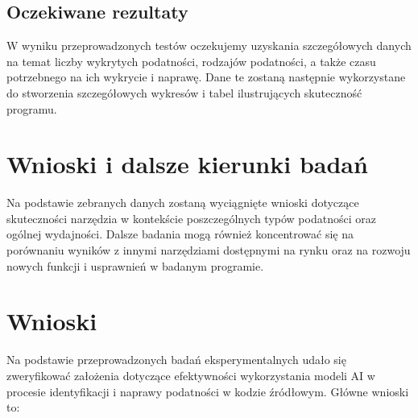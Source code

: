 \subsection{Oczekiwane rezultaty}
W wyniku przeprowadzonych testów oczekujemy uzyskania szczegółowych danych na temat liczby wykrytych podatności, rodzajów podatności, a także czasu potrzebnego na ich wykrycie i naprawę. Dane te zostaną następnie wykorzystane do stworzenia szczegółowych wykresów i tabel ilustrujących skuteczność programu.

\section{Wnioski i dalsze kierunki badań}
Na podstawie zebranych danych zostaną wyciągnięte wnioski dotyczące skuteczności narzędzia w kontekście poszczególnych typów podatności oraz ogólnej wydajności. Dalsze badania mogą również koncentrować się na porównaniu wyników z innymi narzędziami dostępnymi na rynku oraz na rozwoju nowych funkcji i usprawnień w badanym programie.


\section{Wnioski}
\label{sec:wnioski}

Na podstawie przeprowadzonych badań eksperymentalnych udało się zweryfikować założenia dotyczące efektywności wykorzystania modeli AI w procesie identyfikacji i naprawy podatności w kodzie źródłowym. Główne wnioski to:

